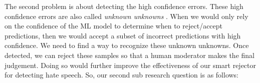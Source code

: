 
The second problem is about detecting the high confidence errors. These high confidence errors are also called \textit{unknown unknowns} \cite{liu2020towards}. When we would only rely on the confidence of the ML model to determine when to reject/accept predictions, then we would accept a subset of incorrect predictions with high confidence. We need to find a way to recognize these unknown unknowns. Once detected, we can reject these samples so that a human moderator makes the final judgement. Doing so would further improve the effectiveness of our smart rejector for detecting hate speech. So, our second sub research question is as follows:






